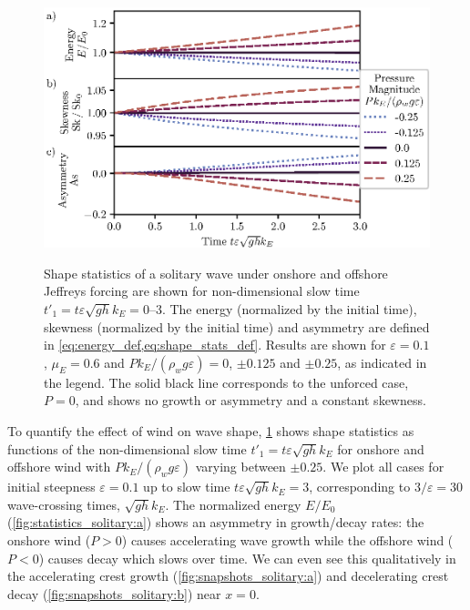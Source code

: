 \documentclass{jfm}
\renewcommand*{\epsilon}{\varepsilon}
\begin{document}
\begin{figure}
  \centering
  { %
    \label{fig:statistics_solitary:a}
    \label{fig:statistics_solitary:b}
    \label{fig:statistics_solitary:c}
  }
  \includegraphics{Skew-Asymm-Production.eps}
  \caption{
    Shape statistics of a solitary wave under onshore and offshore
    Jeffreys forcing are shown for non-dimensional slow time $t'_1 = t
    \epsilon \sqrt{gh} k_E = \numrange{0}{3}$.
    The
    energy (normalized by the initial time),
    skewness (normalized by the initial time) and
    asymmetry are defined in
    \cref{eq:energy_def,eq:shape_stats_def}.
    Results are shown for $\epsilon=0.1$, $\mu_E = 0.6$ and $P
    k_E/(\rho_w g \epsilon) = 0$, $\pm 0.125$ and $\pm 0.25$, as
    indicated in the legend.
    The solid black line corresponds to the unforced case, $P = 0$, and
    shows no growth or asymmetry and a constant skewness.
  }\label{fig:statistics_solitary}
\end{figure}

To quantify the effect of wind on wave shape,
\cref{fig:statistics_solitary} shows shape statistics as functions of
the non-dimensional slow time $t'_1 = t \epsilon \sqrt{g h} k_E$ for
onshore and offshore wind with $P k_E/(\rho_w g \epsilon)$ varying
between $\pm 0.25$.
We plot all cases for initial steepness $\epsilon = 0.1$ up to slow time
$t \epsilon \sqrt{g h} k_E = 3$, corresponding to $3/\epsilon = 30$
wave-crossing times, $\sqrt{gh} k_E$.
The normalized energy $E/E_0$ (\cref{fig:statistics_solitary:a}) shows
an asymmetry in growth/decay rates: the onshore wind ($P>0$) causes
accelerating wave growth while the offshore wind ($P<0$) causes decay
which slows over time.
We can even see this qualitatively in the accelerating crest growth
(\cref{fig:snapshots_solitary:a}) and decelerating crest decay
(\cref{fig:snapshots_solitary:b}) near $x=0$.
\end{document}
